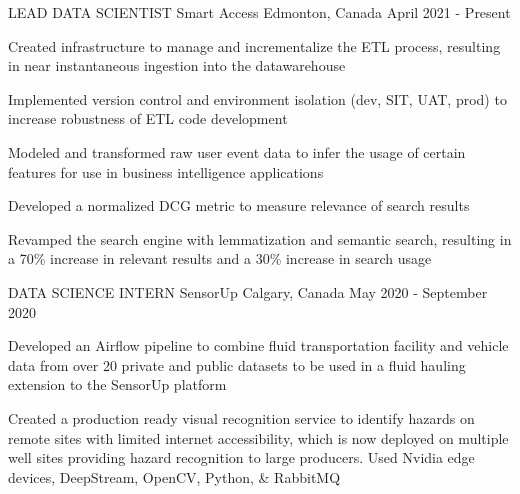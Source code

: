 
\begin{cventries}
  \cventry
    {LEAD DATA SCIENTIST} %
    {Smart Access} %
    {Edmonton, Canada} %
    {April 2021 - Present} %
    {
      \begin{cvitems} %
        \item {Created infrastructure to manage and incrementalize the ETL process, resulting in near instantaneous ingestion into the datawarehouse}
        \item {Implemented version control and environment isolation (dev, SIT, UAT, prod) to increase robustness of ETL code development}
        \item {Modeled and transformed raw user event data to infer the usage of certain features for use in business intelligence applications}
        \item {Developed a normalized DCG metric to measure relevance of search results}
        \item {Revamped the search engine with lemmatization and semantic search, resulting in a 70\% increase in relevant results and a 30\% increase in search usage}
      \end{cvitems}
    }

  \cventry
    {DATA SCIENCE INTERN} %
    {SensorUp} %
    {Calgary, Canada} %
    {May 2020 - September 2020} %
    {
      \begin{cvitems} %
        \item {Developed an Airflow pipeline to combine fluid transportation facility and vehicle data from over 20 private and public datasets to be used in a fluid hauling extension to the SensorUp platform}
        \item {Created a production ready visual recognition service to identify hazards on remote sites with limited internet accessibility, which is now deployed on multiple well sites providing hazard recognition to large producers. Used Nvidia edge devices, DeepStream, OpenCV, Python, \& RabbitMQ}
      \end{cvitems}
    }


\end{cventries}
